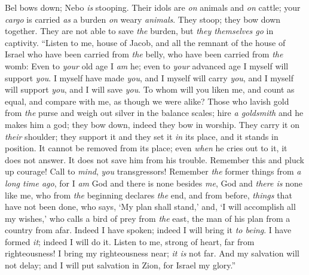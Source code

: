 \begin{biblechapter} %
 Bel bows down; 
Nebo \textit{is} stooping. 
Their idols are \textit{on} animals and \textit{on} cattle; 
your \textit{cargo} is carried \textit{as} a burden \textit{on} weary \textit{animals}.
\verse They stoop; 
they bow down together. 
They are not able to save \textit{the} burden, 
but \textit{they themselves go} in captivity.
\verse “Listen to me, house of Jacob, 
and all the remnant of the house of Israel 
who have been carried from \textit{the} belly, 
who have been carried from \textit{the} womb:
\verse Even to \textit{your} old age I \textit{am} he; 
even to \textit{your} advanced age I myself will support \textit{you}. 
I myself have made \textit{you}, 
and I myself will carry \textit{you}, 
and I myself will support \textit{you}, 
and I will save \textit{you}.
\verse To whom will you liken me, 
and count as equal, 
and compare with me, 
as though we were alike?
\verse Those who lavish gold from \textit{the} purse 
and weigh out silver in the balance scales; 
hire \textit{a goldsmith} 
and he makes him a god; 
they bow down, 
indeed they bow in worship.
\verse They carry it on \textit{their} shoulder; 
they support it and they set it \textit{in} its place, 
and it stands in position. 
It cannot be removed from its place; 
even \textit{when} he cries out to it, it does not answer. 
It does not save him from his trouble.
\verse Remember this and pluck up courage! 
Call to \textit{mind}, \textit{you} transgressors!
\verse Remember \textit{the} former things from \textit{a long time ago}, 
for I \textit{am} God and there is none besides \textit{me}, 
God and \textit{there is} none like me,
\verse who from \textit{the} beginning declares \textit{the} end, 
and from before, \textit{things} that have not been done, 
who says, ‘My plan shall stand,’ 
and, ‘I will accomplish all my wishes,’
\verse who calls a bird of prey from \textit{the} east, 
the man of his plan from a country from afar. 
Indeed I have spoken; indeed I will bring it \textit{to being}. 
I have formed \textit{it}; indeed I will do it.
\verse Listen to me, strong of heart, 
far from righteousness!
\verse I bring my righteousness near; \textit{it is} not far. 
And my salvation will not delay; 
and I will put salvation in Zion, 
for Israel my glory.”
\end{biblechapter}

